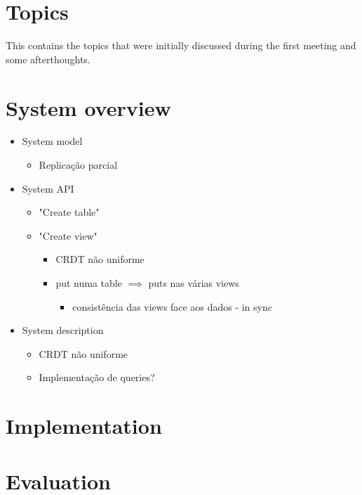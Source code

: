 \documentclass{vldb}
\begin{document}



\null\newpage\null

\null\newpage\null

\section{Topics}

This contains the topics that were initially discussed during the first meeting and some afterthoughts.

\section{System overview}

\begin{itemize}
	\item System model
	\begin{itemize}
		\item Replicação parcial
	\end{itemize}
	\item System API
	\begin{itemize}
		\item "Create table"
		\item "Create view"
		\begin{itemize}
			\item CRDT não uniforme
			\item put numa table $\implies$ puts nas várias views
			\begin{itemize}
				\item consistência das views face aos dados - in sync
			\end{itemize}
		\end{itemize}
	\end{itemize}
	\item System description
	\begin{itemize}
		\item CRDT não uniforme
		\item Implementação de queries?
	\end{itemize}
	
\end{itemize}

\section{Implementation}

\section{Evaluation}
\end{document}
